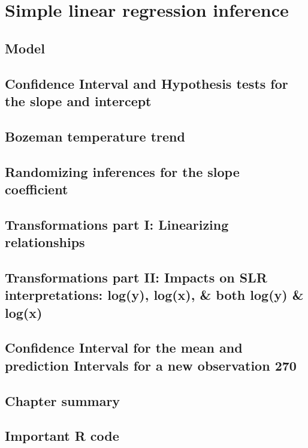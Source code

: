\documentclass[]{book}
\begin{document}
{{\chapter{Simple linear regression inference}\label{chapter7}

\section{Model}\label{section7-1}

\section{Confidence Interval and Hypothesis tests for the slope and
intercept}\label{section7-2}

\section{Bozeman temperature trend}\label{section7-3}

\section{Randomizing inferences for the slope
coefficient}\label{section7-4}

\section{Transformations part I: Linearizing
relationships}\label{section7-5}

\section{Transformations part II: Impacts on SLR interpretations:
log(y), log(x), \& both log(y) \& log(x)}\label{section7-6}

\section{Confidence Interval for the mean and prediction Intervals for a
new observation
270}\label{confidence-interval-for-the-mean-and-prediction-intervals-for-a-new-observation-270}

\section{Chapter summary}\label{section7-7}

\section{Important R code}\label{section7-8}

}}
\end{document}
